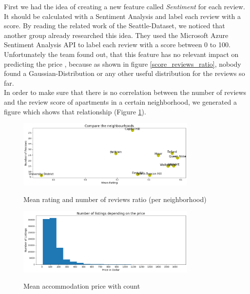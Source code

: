 \documentclass[journal]{IEEEtran}
\begin{document}
First we had the idea of creating a new feature called \textit{Sentiment} for each review. It should be calculated with a Sentiment Analysis and label each review with a score. By reading the related work of the Seattle-Dataset, we noticed that another group already researched this idea. They used the Microsoft Azure Sentiment Analysis API to label each review with a score between 0 to 100. Unfortunately the team found out, that this feature has no relevant impact on predicting the price \cite{RN1}, because as shown in figure \ref{score_reviews_ratio}, nobody found a Gaussian-Distribution or any other useful distribution for the reviews so far.\\
In order to make sure that there is no correlation between the number of reviews and the review score of apartments in a certain neighborhood, we generated a figure which shows that relationship (Figure \ref{compare_the_neighbourhoods}). \\
%
\begin{figure}
  \begin{center}
  \includegraphics[width=3.5in]{photo/2_2_compare_the_neighbourhoods.png}\\
  \caption{Mean rating and number of reviews ratio (per neighborhood)}\label{compare_the_neighbourhoods}
  \end{center}
\end{figure}
%

\begin{figure}
  \begin{center}
  \includegraphics[width=3.5in]{photo/1_number_of_listings_depending_on_price.png}\\
  \caption{Mean accommodation price with count}\label{mean_acc}
  \end{center}
\end{figure}
%
\end{document}
